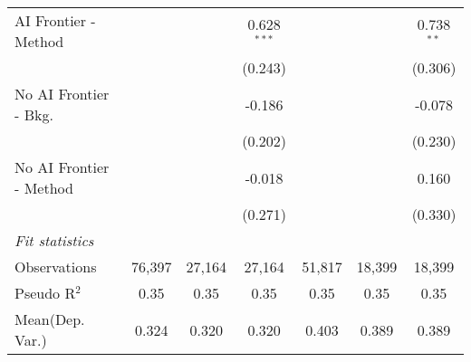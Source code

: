 \begin{tabular}{lcccccc}
   AI Frontier - Method    &               &               & 0.628$^{***}$ &               &              & 0.738$^{**}$\\   
                           &               &               & (0.243)       &               &              & (0.306)\\   
   No AI Frontier - Bkg.   &               &               & -0.186        &               &              & -0.078\\   
                           &               &               & (0.202)       &               &              & (0.230)\\   
   No AI Frontier - Method &               &               & -0.018        &               &              & 0.160\\   
                           &               &               & (0.271)       &               &              & (0.330)\\   
   \midrule
   \emph{Fit statistics}\\
   Observations            & 76,397        & 27,164        & 27,164        & 51,817        & 18,399       & 18,399\\  
   Pseudo R$^2$            & 0.35          & 0.35          & 0.35          & 0.35          & 0.35         & 0.35\\  
Mean(Dep. Var.) & 0.324 & 0.320 & 0.320 & 0.403 & 0.389 & 0.389 \\
   

\end{tabular}
